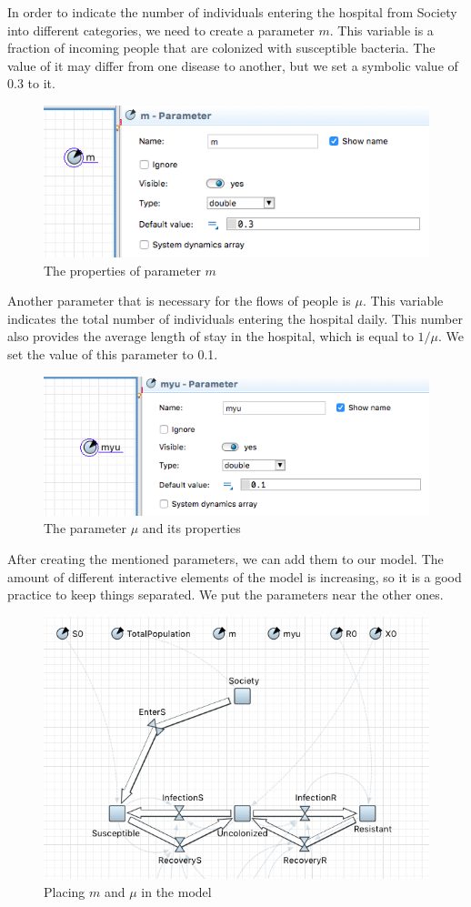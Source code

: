 In order to indicate the number of individuals entering the hospital from Society into different categories, we need to create a parameter $m$. This variable is a fraction of incoming people that are colonized with susceptible bacteria. The value of it may differ from one disease to another, but we set a symbolic value of 0.3 to it.

\begin{figure}[H]
  \centering
  \includegraphics[height=0.3\textwidth]{img/screens/society/society4}
  \caption{The properties of parameter $m$}
\end{figure}

Another parameter that is necessary for the flows of people is $\mu$. This variable indicates the total number of individuals entering the hospital daily. This number also provides the average length of stay in the hospital, which is equal to $1/\mu$. We set the value of this parameter to 0.1.

\begin{figure}[H]
  \centering
  \includegraphics[height=0.3\textwidth]{img/screens/society/society6}
  \caption{The parameter $\mu$ and its properties}
\end{figure}

After creating the mentioned parameters, we can add them to our model. The amount of different interactive elements of the model is increasing, so it is a good practice to keep things separated. We put the parameters near the other ones.

\begin{figure}[H]
  \centering
  \includegraphics[height=0.5\textwidth]{img/screens/society/society5}
  \caption{Placing $m$ and $\mu$ in the model}
\end{figure}

